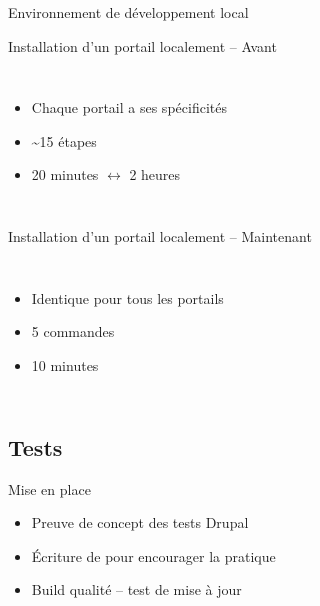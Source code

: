 \begin{frame}{Environnement de développement local}
	\begin{overprint}
		\begin{block}{Installation d'un portail localement -- Avant}
			\begin{columns}[onlytextwidth]
				\begin{itemize}
					\item Chaque portail a ses spécificités
					\item \textasciitilde 15 étapes
					\item 20 minutes $\longleftrightarrow$ 2 heures
				\end{itemize}
			\end{columns}
		\end{block}
		\begin{block}{Installation d'un portail localement -- Maintenant}
			\begin{columns}[onlytextwidth]
				\begin{itemize}
					\item Identique pour tous les portails
					\item 5 commandes
					\item 10 minutes
				\end{itemize}
			\end{columns}
		\end{block}
	\end{overprint}
\end{frame}

\subsection{Tests}
\begin{frame}{\subsecname}
	\begin{block}{Mise en place}
		\begin{itemize}
			\item Preuve de concept des tests Drupal
			\item Écriture de  pour encourager la pratique
			\item Build qualité -- test de mise à jour
		\end{itemize}
	\end{block}
\end{frame}

